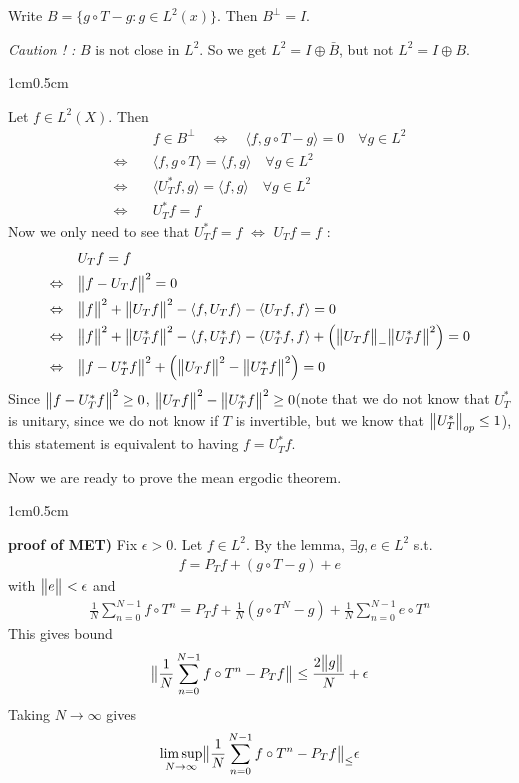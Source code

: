 \documentclass[10pt,a4paper]{report}
\newenvironment{proof}
{\begin{changemargin}{1cm}{0.5cm} 
	}%
	{\end{changemargin}
}
\begin{document}
\lem Write $B = \{g\circ T-g:g\in L^2(x) \}$. Then $B^{\perp} =I$.
\s

\textit{Caution ! :} $B$ is not close in $L^2$. So we get $L^2 = I \oplus \bar{B}$, but not $L^2 = I \oplus B$. 

\begin{proof}
\pf Let $f\in L^2(X)$. Then
\begin{align*}
& f\in B^{\perp} \quad \Leftrightarrow \quad \langle f, g\circ T - g\rangle = 0 \quad \forall g \in L^2 \\
\Leftrightarrow \quad & \langle f, g\circ T \rangle = \langle f, g\rangle \quad \forall g \in L^2 \\
\Leftrightarrow \quad & \langle U^*_T f, g\rangle = \langle f, g\rangle \quad \forall g \in L^2 \\
\Leftrightarrow \quad & U^*_T f = f
\end{align*}
Now we only need to see that $U^*_T f=f$ $\Leftrightarrow$ $U_T f =f$ :
\begin{align*}
& U_T f = f \\
\Leftrightarrow \quad &\bigl\lVert f-U_T f\bigr\rVert_{}^2 = 0 \\
\Leftrightarrow \quad & \bigl\lVert f\bigr\rVert_{}^2 + \bigl\lVert U_T f\bigr\rVert_{}^2 - \langle f, U_T f\rangle - \langle U_T f,f\rangle =0 \\
\Leftrightarrow \quad & \bigl\lVert f\bigr\rVert_{}^2 + \bigl\lVert U^{*}_T f\bigr\rVert_{}^2 - \langle f, U^{*}_T f\rangle - \langle U^{*}_T f, f\rangle + \Big( \bigl\lVert U_T f\bigr\rVert_{-} \bigl\lVert U^*_T f\bigr\rVert_{}^2 \Big) =0 \\
\Leftrightarrow \quad & \bigl\lVert f-U^{*}_T f\bigr\rVert_{}^2 + \Big( \bigl\lVert U_T f\bigr\rVert_{}^2 - \bigl\lVert U^{*}_T f\bigr\rVert_{}^2 \Big) = 0
\end{align*}
Since $\bigl\lVert f-U^*_T f\bigr\rVert_{}^2 \geq 0$, $\bigl\lVert U_T f\bigr\rVert_{}^2 - \bigl\lVert U^*_T f\bigr\rVert_{}^2 \geq 0$(note that we do not know that $U^*_T$ is unitary, since we do not know if $T$ is invertible, but we know that $\bigl\lVert U^*_T\bigr\rVert_{op} \leq 1$), this statement is equivalent to having $f = U^*_T f$.
\end{proof}
\s

Now we are ready to prove the mean ergodic theorem.

\begin{proof}
\textbf{proof of MET) } Fix $\epsilon>0$. Let $f\in L^2$. By the lemma, $\exists g,e \in L^2$ s.t.
\begin{align*}
f= P_T f + (g\circ T -g) +e
\end{align*}
with $\bigl\lVert e\bigr\rVert_{} <\epsilon$ and
\begin{align*}
\frac{1}{N}\sum_{n=0}^{N-1}f\circ T^n = P_T f + \frac{1}{N}(g\circ T^N -g) + \frac{1}{N} \sum_{n=0}^{N-1} e\circ T^n
\end{align*}
This gives bound
\begin{align*}
\bigl\lVert\frac{1}{N}\sum_{n=0}^{N-1}f\circ T^n - P_T f\bigr\rVert_{} \leq \frac{2\bigl\lVert g\bigr\rVert_{}}{N} + \epsilon
\end{align*}
Taking $N\rightarrow \infty$ gives
\begin{align*}
\limsup_{N\rightarrow \infty} \bigl\lVert\frac{1}{N} \sum_{n=0}^{N-1} f\circ T^n - P_T f\bigr\rVert_{\leq} \epsilon
\end{align*}

\eop
\end{proof}
\s
\end{document}
